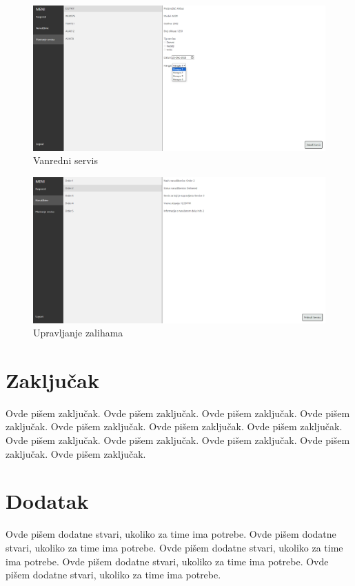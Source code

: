 \documentclass[a4paper]{article}
\begin{document}
\begin{figure}[H]
\begin{center}
\includegraphics[scale=0.3]{UI/vandredni_servis_4.png}
\end{center}
\caption{Vanredni servis}
\label{fig:ui_vanredni_4}
\end{figure}

\begin{figure}[H]
\begin{center}
\includegraphics[scale=0.3]{UI/narudzbine.png}
\end{center}
\caption{Upravljanje zalihama}
\label{fig:ui_upravljanje_zalihama}
\end{figure}

\section{Zaključak}
\label{sec:zakljucak}

Ovde pišem zaključak. 
Ovde pišem zaključak. 
Ovde pišem zaključak. 
Ovde pišem zaključak. 
Ovde pišem zaključak. 
Ovde pišem zaključak. 
Ovde pišem zaključak. 
Ovde pišem zaključak. 
Ovde pišem zaključak. 
Ovde pišem zaključak. 
Ovde pišem zaključak. 
Ovde pišem zaključak. 


\appendix
 


\appendix
\section{Dodatak}
Ovde pišem dodatne stvari, ukoliko za time ima potrebe.
Ovde pišem dodatne stvari, ukoliko za time ima potrebe.
Ovde pišem dodatne stvari, ukoliko za time ima potrebe.
Ovde pišem dodatne stvari, ukoliko za time ima potrebe.
Ovde pišem dodatne stvari, ukoliko za time ima potrebe.
\end{document}
